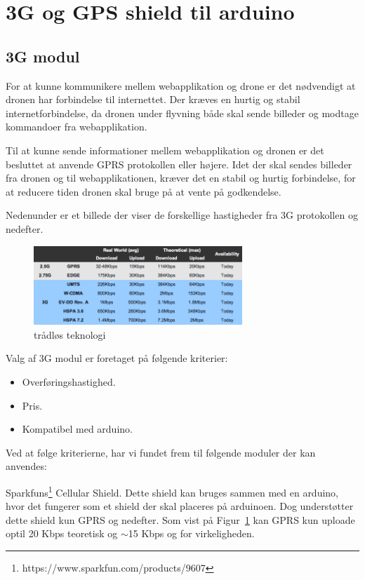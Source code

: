 \section{3G og GPS shield til arduino}

\subsection{3G modul}
For at kunne kommunikere mellem webapplikation og drone er det nødvendigt at dronen har forbindelse til internettet. 
Der kræves en hurtig og stabil internetforbindelse, da dronen under flyvning både skal sende billeder og modtage kommandoer fra webapplikation.

Til at kunne sende informationer mellem webapplikation og dronen er det besluttet at anvende GPRS protokollen eller højere. Idet der skal sendes billeder fra dronen og til webapplikationen, kræver det en stabil og hurtig forbindelse, for at reducere tiden dronen skal bruge på at vente på godkendelse.

Nedenunder er et billede der viser de forskellige hastigheder fra 3G protokollen og nedefter. 

\begin{figure}[H]
\centering
\includegraphics[width=0.7\textwidth]{Billeder/3g-table.png}
\caption[trådløs_teknologi]{trådløs teknologi\protect\footnotemark}
\label{fig:3gtable}
\end{figure}


Valg af 3G modul er foretaget på følgende kriterier:

\begin{itemize}
	\item Overføringshastighed.
	\item Pris.
	\item Kompatibel med arduino.
\end{itemize}

Ved at følge kriterierne, har vi fundet frem til følgende moduler der kan anvendes:

Sparkfuns\footnote{https://www.sparkfun.com/products/9607} Cellular Shield. \newline 
Dette shield kan bruges sammen med en arduino, hvor det fungerer som et shield der skal placeres på arduinoen.
Dog understøtter dette shield kun GPRS og nedefter. Som vist på Figur~\ref{fig:3gtable} kan GPRS kun uploade optil 20 Kbps teoretisk og $\sim$15 Kbps og for virkeligheden.

